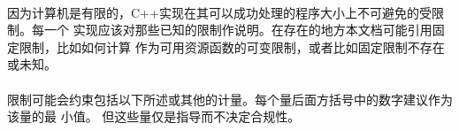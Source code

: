 

\paragraph{}
因为计算机是有限的，C++实现在其可以成功处理的程序大小上不可避免的受限制。每一个
实现应该对那些已知的限制作说明。在存在的地方本文档可能引用固定限制，比如如何计算
作为可用资源函数的可变限制，或者比如固定限制不存在或未知。

\paragraph{}
限制可能会约束包括以下所述或其他的计量。每个量后面方括号中的数字建议作为该量的最
小值。 但这些量仅是指导而不决定合规性。
